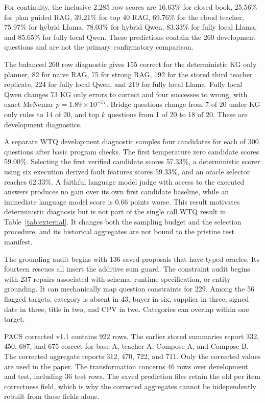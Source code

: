 \documentclass{article}
\begin{document}
For continuity, the inclusive 2,285 row scores are 16.63\% for closed book, 25.56\% for plan guided
RAG, 39.21\% for top 40 RAG, 69.76\% for the cloud teacher, 75.97\% for hybrid Llama, 78.03\% for
hybrid Qwen, 83.33\% for fully local Llama, and 85.65\% for fully local Qwen.  These predictions
contain the 260 development questions and are not the primary confirmatory comparison.

The balanced 260 row diagnostic gives 155 correct for the deterministic KG only planner, 82 for
naive RAG, 75 for strong RAG, 192 for the stored third teacher replicate, 224 for fully local Qwen,
and 219 for fully local Llama.  Fully local Qwen changes 73 KG only errors to correct and four
successes to wrong, with exact McNemar $p=1.89\times10^{-17}$.  Bridge questions change from 7 of
20 under KG only rules to 14 of 20, and top $k$ questions from 1 of 20 to 18 of 20.  These are
development diagnostics.

A separate WTQ development diagnostic samples four candidates for each of 300 questions after basic
program checks.  The first temperature zero candidate scores 59.00\%.  Selecting the first verified
candidate scores 57.33\%, a deterministic scorer using six execution derived fault features scores
59.33\%, and an oracle selector reaches 62.33\%.  A faithful language model judge with access to the
executed answers produces no gain over its own first candidate baseline, while an immediate language
model score is 0.66 points worse.  This result motivates deterministic diagnosis but is not part of
the single call WTQ result in Table~\ref{tab:external}.  It changes both the sampling budget and the
selection procedure, and its historical aggregates are not bound to the pristine test manifest.

The grounding audit begins with 136 saved proposals that have typed oracles.  Its fourteen rescues
all insert the additive sum guard.  The constraint audit begins with 237 repairs associated with
schema, runtime specification, or entity grounding.  It can mechanically map question constraints
for 229.  Among the 56 flagged targets, category is absent in 43, buyer in six, supplier in three,
signed date in three, title in two, and CPV in two.  Categories can overlap within one target.

PACS corrected v1.1 contains 922 rows.  The earlier stored summaries report 332, 450, 687, and 675
correct for base A, teacher A, Compose A, and Compose B.  The corrected aggregate reports 312, 470,
722, and 711.  Only the corrected values are used in the paper.  The transformation concerns 46
rows over development and test, including 36 test rows.  The saved prediction files retain the old
per item correctness field, which is why the corrected aggregates cannot be independently rebuilt
from those fields alone.
\end{document}

